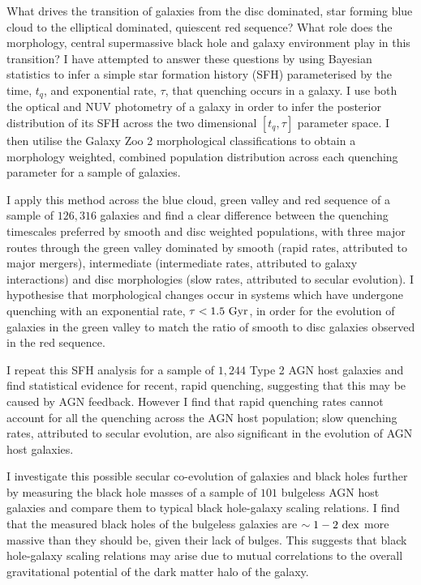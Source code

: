 \documentclass[12pt,useAMS]{ociamthesis}  %
\begin{document}
\begin{abstractlong}  

What drives the transition of galaxies from the disc dominated, star forming blue cloud to the elliptical dominated, quiescent red sequence? What role does the morphology, central supermassive black hole and galaxy environment play in this transition? 
I have attempted to answer these questions by using Bayesian statistics to infer a simple star formation history (SFH) parameterised by the time, $t_q$, and exponential rate, $\tau$, that quenching occurs in a galaxy. I use both the optical and NUV photometry of a galaxy in order to infer the posterior distribution of its SFH across the two dimensional $[t_q, \tau]$ parameter space. I then utilise the Galaxy Zoo 2 morphological classifications to obtain a morphology weighted, combined population distribution across each quenching parameter for a sample of galaxies. 

I apply this method across the blue cloud, green valley and red sequence of a sample of $126,316$ galaxies and find a clear difference between the quenching timescales preferred by smooth and disc weighted populations, with three major routes through the green valley dominated by smooth (rapid rates, attributed to major mergers), intermediate (intermediate rates, attributed to galaxy interactions) and disc morphologies (slow rates, attributed to secular evolution). I hypothesise that morphological changes occur in systems which have undergone quenching with an exponential rate, $\tau < 1.5~\rm{Gyr}$, in order for the evolution of galaxies in the green valley to match the ratio of smooth to disc galaxies observed in the red sequence.

I repeat this SFH analysis for a sample of $1,244$ Type 2 AGN host galaxies and find statistical evidence for recent, rapid quenching, suggesting that this may be caused by AGN feedback. However I find that rapid quenching rates cannot account for all the quenching across the AGN host population; slow quenching rates, attributed to secular evolution, are also significant in the evolution of AGN host galaxies.

I investigate this possible secular co-evolution of galaxies and black holes further by measuring the black hole masses of a sample of $101$ bulgeless AGN host galaxies and compare them to typical black hole-galaxy scaling relations. I find that the measured black holes of the bulgeless galaxies are $\sim1-2~\rm{dex}$ more massive than they should be, given their lack of bulges. This suggests that black hole-galaxy scaling relations may arise due to mutual correlations to the overall gravitational potential of the dark matter halo of the galaxy. 


\end{abstractlong}
\end{document}
